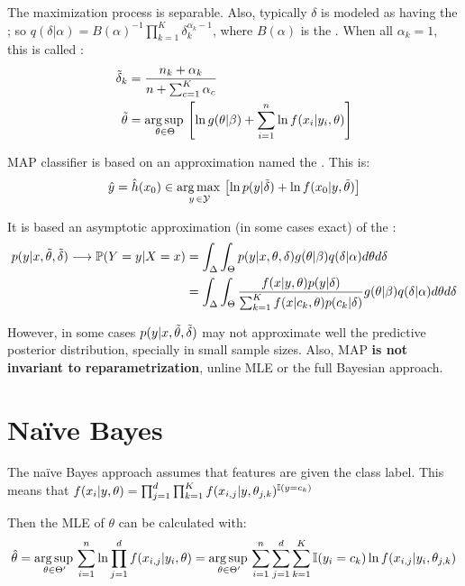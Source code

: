 The maximization process is separable. Also, typically $\delta$ is modeled as having the ; so $q(\delta|\alpha)=B(\alpha)^{-1}\prod_{k=1}^K \delta_k^{\alpha_k-1}$, where $B(\alpha)$ is the . When all $\alpha_k=1$, this is called :
\begin{align*}
    \Tilde{\delta}_k &= \frac{n_k+\alpha_k}{n+\sum_{c=1}^K\alpha_c} \\
    \Tilde{\theta} &= \operatorname*{arg\,sup\,}_{\theta\in\Theta} \left[\ln g(\theta|\beta)+\sum_{i=1}^n\ln f(x_i|y_i,\theta)\right]
\end{align*}

MAP classifier is based on an approximation named the . This is:
\begin{equation*}
    \hat{y}=\hat{h}(x_0) \in \operatorname*{arg\,max\,}_{y\,\in\mathcal{Y}}\left[ \ln p(y|\Tilde{\delta})+\ln f(x_0|y,\Tilde{\theta})\right]
\end{equation*}

It is based an asymptotic approximation (in some cases exact) of the :
\begin{align*}
   p(y|x,\Tilde{\theta},\Tilde{\delta}) \longrightarrow \operatorname{\mathbb{P}}(Y=y|X=x) &= \int_{\Delta}\int_{\Theta}p(y|x,\theta,\delta)g(\theta|\beta)q(\delta|\alpha)d\theta d\delta\\ &= \int_{\Delta}\int_{\Theta}\frac{f(x|y,\theta)p(y|\delta)}{\sum_{k=1}^K f(x|c_k,\theta)p(c_k|\delta)}g(\theta|\beta)q(\delta|\alpha)d\theta d\delta
\end{align*}

However, in some cases $p(y|x,\Tilde{\theta},\Tilde{\delta}) $ may not approximate well the predictive posterior distribution, specially in small sample sizes. Also, MAP \textbf{is not invariant to reparametrization}, unline MLE or the full Bayesian approach.

\section{Naïve Bayes}
The naïve Bayes approach assumes that features are  given the class label. This means that $f(x_i|y,\theta)=\prod_{j=1}^d\prod_{k=1}^K  f(x_{i,j}|y,\theta_{j,k})^{\operatorname{\mathbb{I}}(y=c_k)}$

Then the MLE of $\theta$ can be calculated with:
\begin{equation*}
    \hat{\theta}  = \operatorname*{arg\,sup\,}_{\theta\in\Theta'} \sum_{i=1}^n\ln\prod_{j=1}^d f(x_{i,j}|y_i,\theta) = \operatorname*{arg\,sup\,}_{\theta\in\Theta'} \sum_{i=1}^n\sum_{j=1}^d\sum_{k=1}^K\operatorname{\mathbb{I}}(y_i=c_k)\ln f(x_{i,j}|y_i,\theta_{j,k})
\end{equation*}

